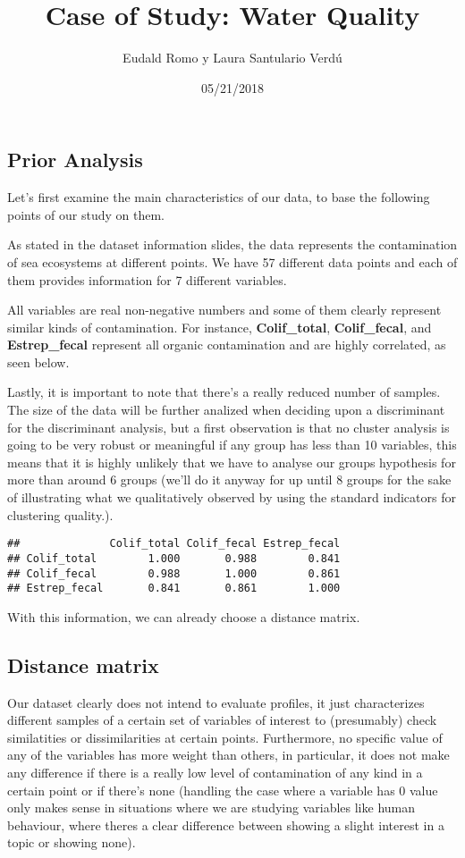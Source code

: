 \documentclass[]{article}
\title{Case of Study: Water Quality}
\author{Eudald Romo y Laura Santulario Verdú}
\date{05/21/2018}
\begin{document}
\maketitle

\subsection{Prior Analysis}\label{prior-analysis}

Let's first examine the main characteristics of our data, to base the
following points of our study on them.

As stated in the dataset information slides, the data represents the
contamination of sea ecosystems at different points. We have 57
different data points and each of them provides information for 7
different variables.

All variables are real non-negative numbers and some of them clearly
represent similar kinds of contamination. For instance,
\textbf{Colif\_total}, \textbf{Colif\_fecal}, and \textbf{Estrep\_fecal}
represent all organic contamination and are highly correlated, as seen
below.

Lastly, it is important to note that there's a really reduced number of
samples. The size of the data will be further analized when deciding
upon a discriminant for the discriminant analysis, but a first
observation is that no cluster analysis is going to be very robust or
meaningful if any group has less than 10 variables, this means that it
is highly unlikely that we have to analyse our groups hypothesis for
more than around 6 groups (we'll do it anyway for up until 8 groups for
the sake of illustrating what we qualitatively observed by using the
standard indicators for clustering quality.).

\begin{verbatim}
##              Colif_total Colif_fecal Estrep_fecal
## Colif_total        1.000       0.988        0.841
## Colif_fecal        0.988       1.000        0.861
## Estrep_fecal       0.841       0.861        1.000
\end{verbatim}

With this information, we can already choose a distance matrix.

\subsection{Distance matrix}\label{distance-matrix}

Our dataset clearly does not intend to evaluate profiles, it just
characterizes different samples of a certain set of variables of
interest to (presumably) check similatities or dissimilarities at
certain points. Furthermore, no specific value of any of the variables
has more weight than others, in particular, it does not make any
difference if there is a really low level of contamination of any kind
in a certain point or if there's none (handling the case where a
variable has 0 value only makes sense in situations where we are
studying variables like human behaviour, where theres a clear difference
between showing a slight interest in a topic or showing none).
\end{document}
